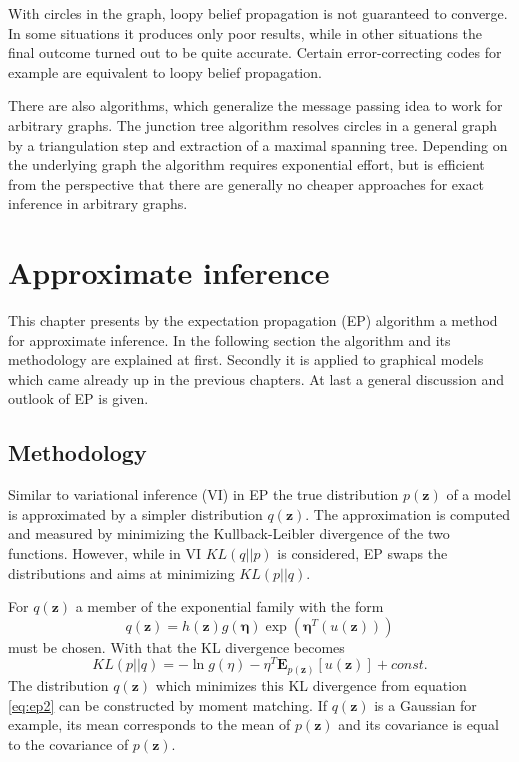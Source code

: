 \documentclass{sigkdd}
\begin{document}
With circles in the graph, loopy belief propagation is not guaranteed to converge. In some situations it produces only poor results, while in other situations the final outcome turned out to be quite accurate. Certain error-correcting codes for example are equivalent to loopy belief propagation.

There are also algorithms, which generalize the message passing idea to work for arbitrary graphs. The junction tree algorithm resolves circles in a general graph by a triangulation step and extraction of a maximal spanning tree. Depending on the underlying graph the algorithm requires exponential effort, but is efficient from the perspective that there are generally no cheaper approaches for exact inference in arbitrary graphs.

\section{Approximate inference}\label{chapter:approximate_inference}
This chapter presents by the expectation propagation (EP) algorithm a method for approximate inference. In the following section the algorithm and its methodology are explained at first. Secondly it is applied to graphical models which came already up in the previous chapters. At last a general discussion and outlook of EP is given.

\subsection{Methodology}
Similar to variational inference (VI) in EP the true distribution $p(\mathbf{z})$ of a model is approximated by a simpler distribution $q(\mathbf{z})$. The approximation is computed and measured by minimizing the Kullback-Leibler divergence of the two functions. However, while in VI $KL(q||p)$ is considered, EP swaps the distributions and aims at minimizing $KL(p||q)$.

For $q(\mathbf{z})$ a member of the exponential family with the form
\begin{equation}\label{eq:ep1}
q(\mathbf{z}) = h(\mathbf{z})g(\mathbf{\eta}) \exp(\mathbf{\eta}^T(u(\mathbf{z})))
\end{equation}
must be chosen. With that the KL divergence becomes
\begin{equation}\label{eq:ep2}
KL(p||q)= - \ln g(\eta) - \eta^T \mathbf{E}_{p(\mathbf{z})} [u(\mathbf{z})] + const.
\end{equation}
The distribution $q(\mathbf{z})$ which minimizes this KL divergence from equation \ref{eq:ep2} can be constructed by moment matching. If $q(\mathbf{z})$ is a Gaussian for example, its mean corresponds to the mean of $p(\mathbf{z})$ and its covariance is equal to the covariance of $p(\mathbf{z})$.
\end{document}
